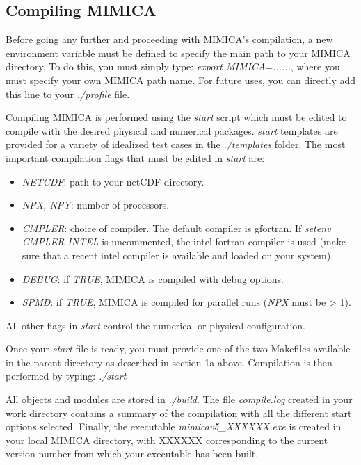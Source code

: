 \documentclass[12pt,A4,french]{article}
\begin{document}
 \subsection{Compiling MIMICA}
 
Before going any further and proceeding with MIMICA's compilation, a new environment variable must be defined to specify the main path to your MIMICA directory. To do this, you must simply type: {\it export MIMICA=......}, where you must specify your own MIMICA path name. For future uses, you can directly add this line to your {\it ./profile} file.

Compiling MIMICA is performed using the {\it start} script which must be  edited to compile with the desired physical and numerical packages. {\it start} templates are provided for a variety of idealized test cases in the {\it ./templates} folder. The most important compilation flags that must be edited in {\it start} are:
\begin{itemize}
                \item {\it NETCDF}: path to your netCDF directory.
                \item {\it NPX, NPY}: number of processors.
                \item {\it CMPLER}: choice of compiler. The default compiler is gfortran. If {\it setenv CMPLER INTEL} is uncommented, the intel fortran compiler is used (make sure that a recent intel compiler is available and loaded on your system).
                \item {\it DEBUG}: if {\it TRUE}, MIMICA is compiled with debug options.
                \item {\it SPMD}: if {\it TRUE}, MIMICA is compiled for parallel runs ({\it NPX} must be > 1).
\end{itemize}
All other flags in {\it start} control the numerical or physical configuration.

Once your {\it start} file is ready, you must provide one of the two Makefiles
available in the parent directory as described in section 1a above. Compilation is then performed by typing: {\it ./start}

All objects and modules are stored in {\it ./build}. The file {\it compile.log} created in your work directory contains a summary of the compilation with all the different start options selected. Finally, the executable {\it mimicav5\_XXXXXX.exe} is created in your local MIMICA directory, with XXXXXX 
corresponding to the current version number from which your executable has been built.
\end{document}
